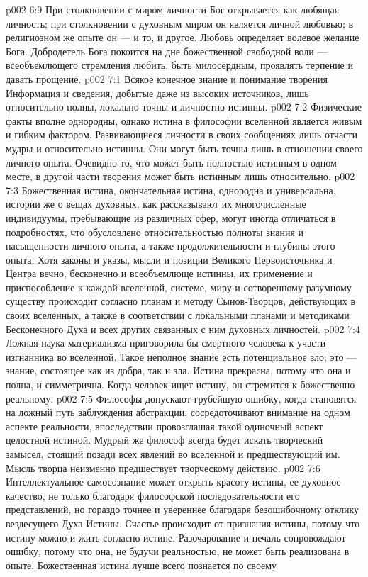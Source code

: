 \vs p002 6:9 \pc При столкновении с миром личности Бог открывается как любящая личность; при столкновении с духовным миром он является личной любовью; в религиозном же опыте он --- и то, и другое. Любовь определяет волевое желание Бога. Добродетель Бога покоится на дне божественной свободной воли --- всеобъемлющего стремления любить, быть милосердным, проявлять терпение и давать прощение.
\vs p002 7:1 Всякое конечное знание и понимание творения  Информация и сведения, добытые даже из высоких источников, лишь относительно полны, локально точны и личностно истинны.
\vs p002 7:2 Физические факты вполне однородны, однако истина в философии вселенной является живым и гибким фактором. Развивающиеся личности в своих сообщениях лишь отчасти мудры и относительно истинны. Они могут быть точны лишь в отношении своего личного опыта. Очевидно то, что может быть полностью истинным в одном месте, в другой части творения может быть истинным лишь относительно.
\vs p002 7:3 Божественная истина, окончательная истина, однородна и универсальна, истории же о вещах духовных, как рассказывают их многочисленные индивидуумы, пребывающие из различных сфер, могут иногда отличаться в подробностях, что обусловлено относительностью полноты знания и насыщенности личного опыта, а также продолжительности и глубины этого опыта. Хотя законы и указы, мысли и позиции Великого Первоисточника и Центра вечно, бесконечно и всеобъемлюще истинны, их применение и приспособление к каждой вселенной, системе, миру и сотворенному разумному существу происходит согласно планам и методу Сынов\hyp{}Творцов, действующих в своих вселенных, а также в соответствии с локальными планами и методиками Бесконечного Духа и всех других связанных с ним духовных личностей.
\vs p002 7:4 \pc Ложная наука материализма приговорила бы смертного человека к участи изгнанника во вселенной. Такое неполное знание есть потенциальное зло; это --- знание, состоящее как из добра, так и зла. Истина прекрасна, потому что она и полна, и симметрична. Когда человек ищет истину, он стремится к божественно реальному.
\vs p002 7:5 Философы допускают грубейшую ошибку, когда становятся на ложный путь заблуждения абстракции, сосредоточивают внимание на одном аспекте реальности, впоследствии провозглашая такой одиночный аспект целостной истиной. Мудрый же философ всегда будет искать творческий замысел, стоящий позади всех явлений во вселенной и предшествующий им. Мысль творца неизменно предшествует творческому действию.
\vs p002 7:6 Интеллектуальное самосознание может открыть красоту истины, ее духовное качество, не только благодаря философской последовательности его представлений, но гораздо точнее и увереннее благодаря безошибочному отклику вездесущего Духа Истины. Счастье происходит от признания истины, потому что истину можно  и жить согласно истине. Разочарование и печаль сопровождают ошибку, потому что она, не будучи реальностью, не может быть реализована в опыте. Божественная истина лучше всего познается по своему 
